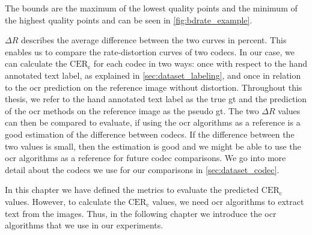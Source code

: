 The bounds are the maximum of the lowest quality points and the minimum of the highest quality points and can be seen in \autoref{fig:bdrate_example}.


$\Delta R$ describes the average difference between the two curves in percent.
This enables us to compare the rate-distortion curves of two codecs.
In our case, we can calculate the $\text{CER}_{\text{c}}$ for each codec in two ways:
once with respect to the hand annotated text label, as explained in \autoref{sec:dataset_labeling}, and once in relation to the \gls{ocr} prediction on the reference image without distortion.
Throughout this thesis, we refer to the hand annotated text label as the true \gls{gt} and the prediction of the \gls{ocr} methods on the reference image as the pseudo \gls{gt}.
The two $\Delta R$ values can then be compared to evaluate, if using the \gls{ocr} algorithms as a reference is a good estimation of the difference between codecs.
If the difference between the two values is small, then the estimation is good and we might be able to use the \gls{ocr} algorithms as a reference for future codec comparisons.
We go into more detail about the codecs we use for our comparisons in \autoref{sec:dataset_codec}.

In this chapter we have defined the metrics to evaluate the predicted $\text{CER}_{\text{c}}$ values.
However, to calculate the $\text{CER}_{\text{c}}$ values, we need \gls{ocr} algorithms to extract text from the images.
Thus, in the following chapter we introduce the \gls{ocr} algorithms that we use in our experiments.
